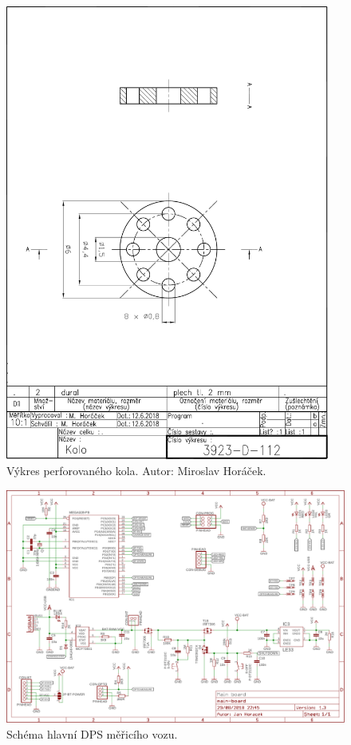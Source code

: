 \vspace{-2em}

\begin{figure}[H]
\includegraphics[width=0.95\textwidth]{data/wheel.pdf}
\caption{Výkres perforovaného kola. Autor: Miroslav Horáček.}
\label{fig:final-wheel}
\end{figure}

\begin{figure}[h]
\includegraphics[angle=90,width=\textwidth]{data/wsm_main_board_v1_3.pdf}
\caption{Schéma hlavní DPS měřicího vozu.}
\label{fig:wsm-sch}
\end{figure}

